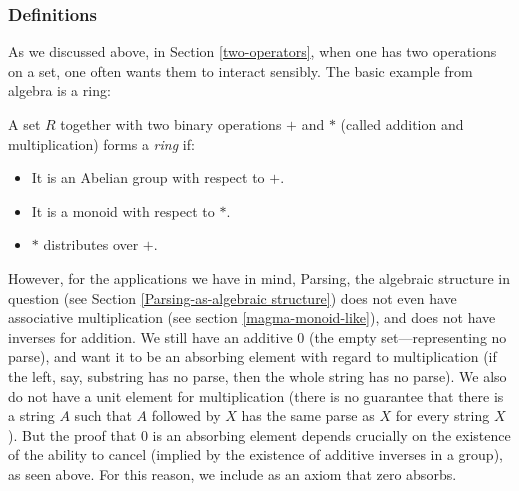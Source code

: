 \subsubsection{Definitions}
As we discussed above, in Section \ref{two-operators}, when one has two operations on a set, one often wants them to interact sensibly. The basic example from algebra is a ring:
\begin{Definition}
A set $R$ together with two binary operations $+$ and $*$ (called addition and multiplication) forms a \emph{ring} if:
\begin{itemize}
\item It is an Abelian group with respect to $+$.
\item It is a monoid with respect to $*$.
\item $*$ distributes over $+$.
\end{itemize}
\end{Definition}
However, for the applications we have in mind, Parsing, the algebraic structure in question (see Section \ref{Parsing-as-algebraic structure}) does not even have associative multiplication (see section \ref{magma-monoid-like}), and does not have inverses for addition. We still have an additive $0$ (the empty set---representing no parse), and want it to be an absorbing element with regard to multiplication (if the left, say, substring has no parse, then the whole string has no parse). We also do not have a unit element for multiplication (there is no guarantee that there is a string $A$ such that $A$ followed by $X$ has the same parse as $X$ for every string $X$). But the proof that $0$ is an absorbing element depends crucially on the existence of the ability to cancel (implied by the existence of additive inverses in a group), as seen above. For this reason, we include as an axiom that zero absorbs.

